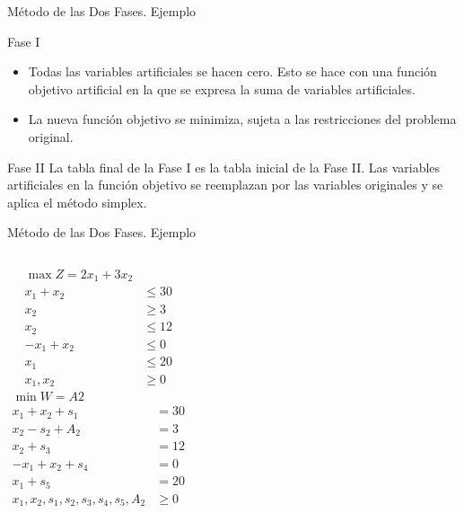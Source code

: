 \begin{frame}{Método de las Dos Fases. Ejemplo}{}

  \begin{block}{Fase I} \justifying
  \begin{itemize} \parskip3mm \justifying
  \item Todas las variables artificiales se hacen cero. Esto se hace con una función objetivo artificial en la que se expresa la suma de variables artificiales.
  \item La nueva \alert{función objetivo se minimiza}, sujeta a las restricciones del problema original.
  \end{itemize}
\end{block}
\begin{block}{Fase II}\justifying
  La tabla final de la Fase I es la tabla inicial de la Fase II. Las variables artificiales en la función objetivo se reemplazan  por las variables originales y se aplica el método simplex.
\end{block}
\end{frame}    

\begin{frame}{Método de las Dos Fases. Ejemplo}{}
  \begin{columns}
  \begin{align*}
    \max Z = 2x_1 + 3x_2 & \\[5mm]
    x_1 + x_2 & \leq 30\\
    x_2 & \geq 3\\
    x_2 & \leq 12\\
    -x_1 + x_2 & \leq 0\\
    x_1  & \leq 20 \\[5mm]
    x_1, x_2 & \geq 0
  \end{align*}  
  \begin{align*}
    \min W = A2 & \\[5mm]
    x_1 + x_2 + s_1  & = 30\\
    x_2  - s_2  + A_2 &= 3\\
    x_2  + s_3 &= 12\\
    -x_1 + x_2 + s_4 & =  0\\
    x_1  + s_5& = 20 \\[5mm]
    x_1, x_2, s_1, s_2, s_3, s_4, s_5, A_2 & \geq 0
  \end{align*} 
  \end{columns}
\end{frame}

